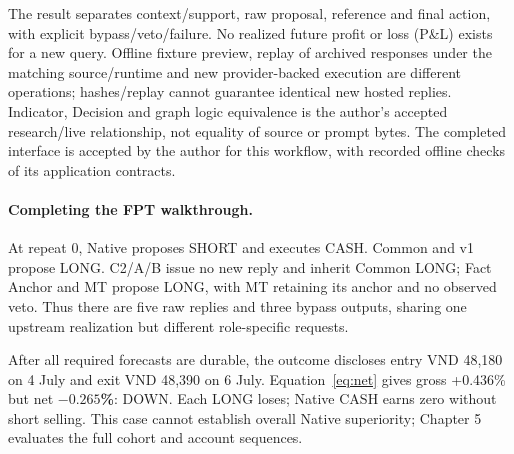 The result separates context/support, raw proposal, reference and final
action, with explicit bypass/veto/failure. No realized future profit or loss (P\&L) exists
for a new query. Offline fixture preview, replay of archived responses
under the matching source/runtime and new provider-backed execution are
different operations; hashes/replay cannot guarantee identical new
hosted replies. Indicator, Decision and graph logic equivalence is the
author's accepted research/live relationship, not equality of source or
prompt bytes. The completed interface is accepted by the author for this
workflow, with recorded offline checks of its application contracts.

\begin{samepage}
\paragraph{Completing the FPT walkthrough.}
At repeat 0, Native proposes SHORT and executes CASH. Common and v1
propose LONG. C2/A/B issue no new reply and inherit Common LONG; Fact
Anchor and MT propose LONG, with MT retaining its anchor and no observed
veto. Thus there are five raw replies and three bypass outputs, sharing
one upstream realization but different role-specific requests.

After all required forecasts are durable, the outcome discloses entry
VND 48,180 on 4 July and exit VND 48,390 on 6 July. Equation~\ref{eq:net}
gives gross +0.436\% but net \textbf{$-0.265$\%}: DOWN.
Each LONG loses; Native CASH earns zero without short selling. This
case cannot establish overall Native superiority; Chapter 5 evaluates
the full cohort and account sequences.
\end{samepage}
